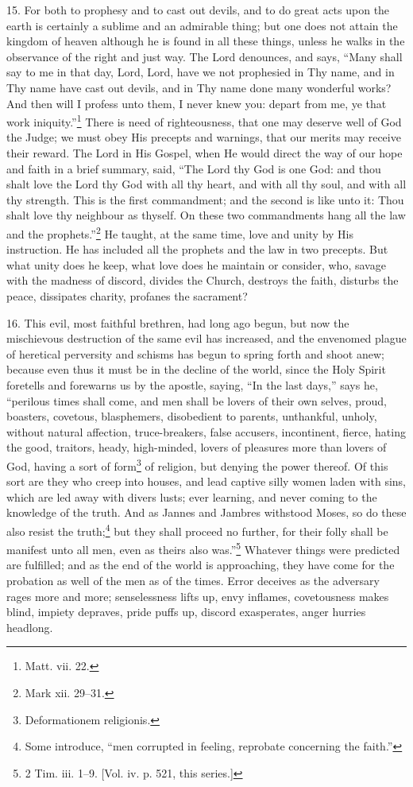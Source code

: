15. For both to prophesy and to cast out devils, and to do great acts upon the earth is certainly a sublime and an admirable thing; but one does not attain the kingdom of heaven although he is found in all these things, unless he walks in the observance of the right and just way. The Lord denounces, and says, “Many shall say to me in that day, Lord, Lord, have we not prophesied in Thy name, and in Thy name have cast out devils, and in Thy name done many wonderful works? And then will I profess unto them, I never knew you: depart from me, ye that work iniquity.”\footnote{Matt. vii. 22.} There is need of righteousness, that one may deserve well of God the Judge; we must obey His precepts and warnings, that our merits may receive their reward. The Lord in His Gospel, when He would direct the way of our hope and faith in a brief summary, said, “The Lord thy God is one God: and thou shalt love the Lord thy God with all thy heart, and with all thy soul, and with all thy strength. This is the first commandment; and the second is like unto it: Thou shalt love thy neighbour as thyself. On these two commandments hang all the law and the prophets.”\footnote{Mark xii. 29–31.} He taught, at the same time, love and unity by His instruction. He has included all the prophets and the law in two precepts. But what unity does he keep, what love does he maintain or consider, who, savage with the madness of discord, divides the Church, destroys the faith, disturbs the peace, dissipates charity, profanes the sacrament?

16. This evil, most faithful brethren, had long ago begun, but now the mischievous destruction of the same evil has increased, and the envenomed plague of heretical perversity and schisms has begun to spring forth and shoot anew; because even thus it must be in the decline of the world, since the Holy Spirit foretells and forewarns us by the apostle, saying, “In the last days,” says he, “perilous times shall come, and men shall be lovers of their own selves, proud, boasters, covetous, blasphemers, disobedient to parents, unthankful, unholy, without natural affection, truce-breakers, false accusers, incontinent, fierce, hating the good, traitors, heady, high-minded, lovers of pleasures more than lovers of God, having a sort of form\footnote{Deformationem religionis.} of religion, but denying the power thereof. Of this sort are they who creep into houses, and lead captive silly women laden with sins, which are led away with divers lusts; ever learning, and never coming to the knowledge of the truth. And as Jannes and Jambres withstood Moses, so do these also resist the truth;\footnote{Some introduce, “men corrupted in feeling, reprobate concerning the faith.”} but they shall proceed no further, for their folly shall be manifest unto all men, even as theirs also was.”\footnote{2 Tim. iii. 1–9. [Vol. iv. p. 521, this series.]} Whatever things were predicted are fulfilled; and as the end of the world is approaching, they have come for the probation as well of the men as of the times. Error deceives as the adversary rages more and more; senselessness lifts up, envy inflames, covetousness makes blind, impiety depraves, pride puffs up, discord exasperates, anger hurries headlong.

